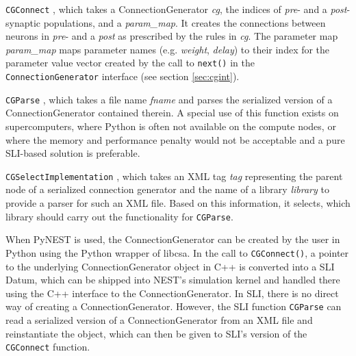 \documentclass{frontiersSCNS} %
\begin{document}
\begin{unlist}
\item[\tt CGConnect], which takes a ConnectionGenerator \emph{cg}, the
  indices of \emph{pre}- and a \emph{post}-synaptic populations, and a
  \emph{param\_map}. It creates the connections between neurons in
  \emph{pre}- and a \emph{post} as prescribed by the rules in
  \emph{cg}. The parameter map \emph{param\_map} maps parameter names
  (e.g. \emph{weight}, \emph{delay}) to their index for the parameter
  value vector created by the call to \verb|next()| in the
  \verb|ConnectionGenerator| interface (see section \ref{sec:cgint}).
\item[\tt CGParse], which takes a file name \emph{fname} and parses
  the serialized version of a ConnectionGenerator contained therein. A
  special use of this function exists on supercomputers, where Python
  is often not available on the compute nodes, or where the memory and
  performance penalty would not be acceptable and a pure SLI-based
  solution is preferable.
\item[\tt CGSelectImplementation], which takes an XML tag \emph{tag}
  representing the parent node of a serialized connection generator
  and the name of a library \emph{library} to provide a parser for
  such an XML file. Based on this information, it selects, which
  library should carry out the functionality for \verb|CGParse|.
\end{unlist}

When PyNEST is used, the ConnectionGenerator can be created by the
user in Python using the Python wrapper of libcsa. In the call to
\verb|CGConnect()|, a pointer to the underlying ConnectionGenerator
object in C++ is converted into a SLI Datum, which can be shipped into
NEST's simulation kernel and handled there using the C++ interface to
the ConnectionGenerator. In SLI, there is no direct way of creating a
ConnectionGenerator. However, the SLI function \verb|CGParse| can
read a serialized version of a ConnectionGenerator from an XML file
and reinstantiate the object, which can then be given to SLI's version
of the \verb|CGConnect| function.
\end{document}

